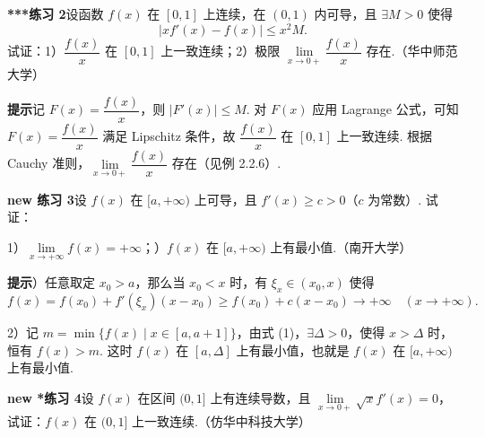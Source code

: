 \documentclass[UTF8,12pt,a4paper,fontset=fandol]{ctexart}
\begin{document}
\noindent\textbf{***练习 2}\quad 设函数 $f(x)$ 在 $[0,1]$ 上连续，在 $(0,1)$ 内可导，且 $\exists M>0$ 使得
\begin{equation}
  |xf'(x)-f(x)|\le x^2M.
\tag{1}
\end{equation}
试证：1）$\dfrac{f(x)}x$ 在 $[0,1]$ 上一致连续；2）极限 $\lim\limits_{x\to0+}\dfrac{f(x)}x$ 存在.（华中师范大学）

\noindent\textbf{提示}\quad 记 $F(x)=\dfrac{f(x)}x$，则 $|F'(x)|\le M$. 对 $F(x)$ 应用 Lagrange 公式，可知 $F(x)=\dfrac{f(x)}x$ 满足 Lipschitz 条件，故 $\dfrac{f(x)}x$ 在 $[0,1]$ 上一致连续. 根据 Cauchy 准则，$\lim\limits_{x\to0+}\dfrac{f(x)}x$ 存在（见例 2.2.6）.

\noindent\textbf{new 练习 3}\quad 设 $f(x)$ 在 $[a,+\infty)$ 上可导，且 $f'(x)\ge c>0$（$c$ 为常数）. 试证：

1）$\lim\limits_{x\to+\infty}f(x)=+\infty$；）$f(x)$ 在 $[a,+\infty)$ 上有最小值.（南开大学）

\noindent\textbf{提示}）任意取定 $x_0>a$，那么当 $x_0<x$ 时，有 $\xi_x\in(x_0,x)$ 使得
\begin{equation}
  f(x)=f(x_0)+f'(\xi_x)(x-x_0)\ge f(x_0)+c(x-x_0)\to+\infty\quad(x\to+\infty).
\tag{1}
\end{equation}

2）记 $m=\min\{f(x)\mid x\in[a,a+1]\}$，由式 (1)，$\exists\Delta>0$，使得 $x>\Delta$ 时，恒有 $f(x)>m$. 这时 $f(x)$ 在 $[a,\Delta]$ 上有最小值，也就是 $f(x)$ 在 $[a,+\infty)$ 上有最小值.

\noindent\textbf{new *练习 4}\quad 设 $f(x)$ 在区间 $(0,1]$ 上有连续导数，且 $\lim\limits_{x\to0+}\sqrt{x}f'(x)=0$，试证：$f(x)$ 在 $(0,1]$ 上一致连续.（仿华中科技大学）
\end{document}
